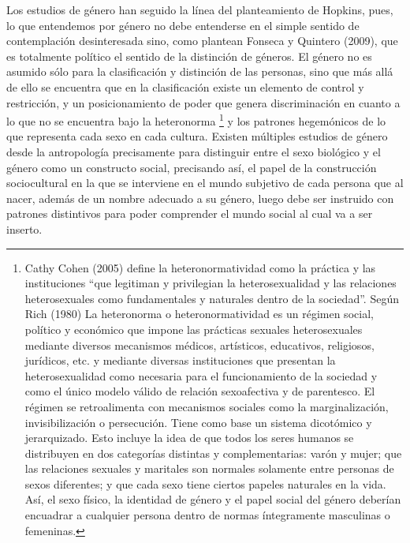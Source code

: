 Los estudios de género han seguido la línea del planteamiento de Hopkins,
pues, lo que entendemos por género no debe entenderse en el simple sentido de
contemplación desinteresada sino, como plantean Fonseca y Quintero (2009), que
es totalmente político el sentido de la distinción de géneros.
El género no es asumido sólo para la clasificación y distinción de las personas,
sino que más allá de ello se encuentra que en la clasificación existe un
elemento de control y restricción, y un posicionamiento de poder que genera
discriminación en cuanto a lo que no se encuentra bajo la heteronorma
\footnote{Cathy Cohen (2005) define la heteronormatividad como la práctica y
las instituciones “que legitiman y privilegian la heterosexualidad y las
relaciones heterosexuales como fundamentales y naturales dentro de la
sociedad”. Según Rich (1980) La heteronorma o heteronormatividad
es un régimen social, político y económico que impone las prácticas sexuales
heterosexuales mediante diversos mecanismos médicos, artísticos, educativos,
religiosos, jurídicos, etc. y mediante diversas instituciones que presentan
la heterosexualidad como necesaria para el funcionamiento de la sociedad y como
el único modelo válido de relación sexoafectiva y de parentesco.
El régimen se retroalimenta con mecanismos sociales como la marginalización,
invisibilización o persecución.
Tiene como base un sistema dicotómico y jerarquizado.
Esto incluye la idea de que todos los seres humanos se distribuyen en dos
categorías distintas y complementarias: varón y mujer;
que las relaciones sexuales y maritales son normales solamente entre personas de
sexos diferentes;
y que cada sexo tiene ciertos papeles naturales en la vida.
Así, el sexo físico, la identidad de género y el papel social del género
deberían encuadrar a cualquier persona dentro de normas íntegramente masculinas
o femeninas.}
y los patrones hegemónicos de lo que representa cada sexo en cada cultura.
Existen múltiples estudios de género desde la antropología
precisamente para distinguir entre el sexo biológico y el género como un
constructo social, precisando así, el papel de la construcción sociocultural en
la que se interviene en el mundo subjetivo de cada persona que al nacer, además
de un nombre adecuado a su género, luego debe ser instruido con patrones
distintivos para poder comprender el mundo social al cual va a ser inserto.


